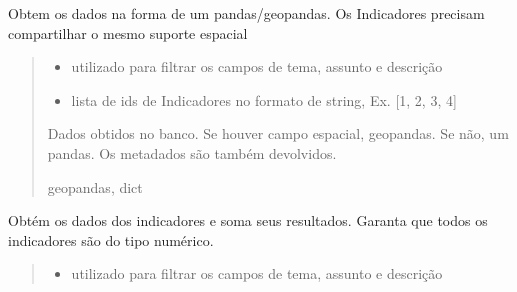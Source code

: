 \documentclass[letterpaper,10pt,brazil]{sphinxmanual}
\begin{document}
\begin{fulllineitems}
\begin{fulllineitems}
\label{\detokenize{api_gen/apiModulo.api_consulta:apiModulo.api_consulta.ApiConsulta.obterTema}}
\pysigstartsignatures
{}
\pysigstopsignatures
\sphinxAtStartPar
Obtem os dados na forma de um pandas/geopandas. Os Indicadores precisam compartilhar o mesmo suporte espacial
\begin{quote}\begin{description}
\begin{itemize}
\item {} 
\sphinxAtStartPar
{} \textendash{} utilizado para filtrar os campos de tema, assunto e descrição

\item {} 
\sphinxAtStartPar
{} \textendash{} lista de ids de Indicadores no formato de string, Ex. {[}1, 2, 3, 4{]}

\end{itemize}

\sphinxAtStartPar
Dados obtidos no banco. Se houver campo espacial, geopandas. Se não, um pandas. Os metadados são também devolvidos.

\sphinxAtStartPar
geopandas, dict

\end{description}\end{quote}

\end{fulllineitems}


\begin{fulllineitems}
\label{\detokenize{api_gen/apiModulo.api_consulta:apiModulo.api_consulta.ApiConsulta.obterTemaSoma}}
\pysigstartsignatures
{}
\pysigstopsignatures
\sphinxAtStartPar
Obtém os dados dos indicadores e soma seus resultados.
Garanta que todos os indicadores são do tipo numérico.
\begin{quote}\begin{description}
\begin{itemize}
\item {} 
\sphinxAtStartPar
{} \textendash{} utilizado para filtrar os campos de tema, assunto e descrição


\end{itemize}
\end{description}
\end{quote}
\end{fulllineitems}
\end{fulllineitems}
\end{document}
